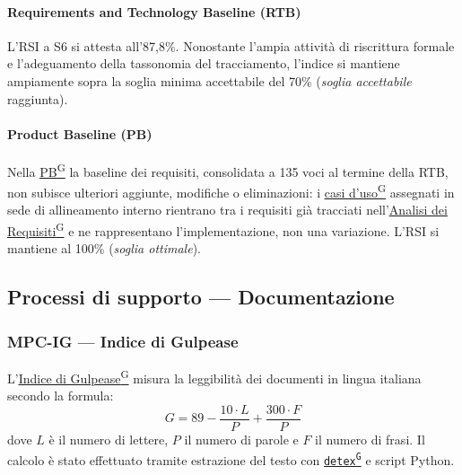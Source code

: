 \documentclass[a4paper,12pt]{article}
\providecommand{\glslink}[2]{\href{https://alittlebyte-19.github.io/Documentazione/glossario.html\#gls-#1}{\underline{#2}\textsuperscript{\scriptsize G}}}
\begin{document}
\paragraph*{Requirements and Technology Baseline (RTB)} L'RSI a S6 si attesta all'87,8\%. Nonostante l'ampia attività di riscrittura formale e l'adeguamento della tassonomia del tracciamento, l'indice si mantiene ampiamente sopra la soglia minima accettabile del 70\% (\emph{soglia accettabile} raggiunta).

\paragraph*{Product Baseline (PB)} Nella \glslink{pb-product-baseline}{PB} la baseline dei requisiti, consolidata a 135 voci al termine della RTB, non subisce ulteriori aggiunte, modifiche o eliminazioni: i \glslink{caso-d-uso-uc}{casi d'uso} assegnati in sede di allineamento interno rientrano tra i requisiti già tracciati nell'\glslink{analisi-dei-requisiti-adr}{Analisi dei Requisiti} e ne rappresentano l'implementazione, non una variazione. L'RSI si mantiene al 100\% (\emph{soglia ottimale}).

\subsection{Processi di supporto — Documentazione}

\subsubsection{MPC-IG — Indice di Gulpease}

L'\glslink{indice-di-gulpease-mpc-ig}{Indice di Gulpease} misura la leggibilità dei documenti in lingua italiana secondo la formula:
\[
  G = 89 - \frac{10 \cdot L}{P} + \frac{300 \cdot F}{P}
\]
dove $L$ è il numero di lettere, $P$ il numero di parole e $F$ il numero di frasi. Il calcolo è stato effettuato tramite estrazione del testo con \texttt{\glslink{detex}{detex}} e script Python.
\end{document}
